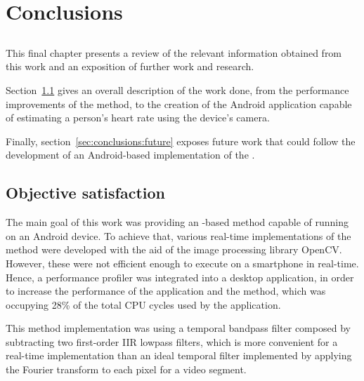 \chapter{Conclusions} \label{chap:conclusions}

\section*{}



This final chapter presents a review of the relevant information obtained
from this work and an exposition of further work and research.

Section~\ref{sec:conclusions:objectives} gives an overall description of
the work done, from the performance improvements of the \evm{} method,
to the creation of the Android application capable of estimating a
person's heart rate using the device's camera.

Finally, section~\ref{sec:conclusions:future} exposes future work that
could follow the development of an Android-based implementation
of the \evm{}.

\section{Objective satisfaction} \label{sec:conclusions:objectives}

The main goal of this work was providing an \evm{}-based method capable of
running on an Android device. To achieve that, various real-time
implementations of the \evm{} method were developed with the aid of the
image processing library OpenCV. However, these were
not efficient enough to execute on a smartphone in real-time. Hence,
a performance profiler was integrated into a desktop application, in order to
increase the performance of the application and the \evm{} method,
which was occupying 28\% of the total CPU cycles used by the application.

This \evm{} method implementation was using a temporal bandpass filter composed
by subtracting two first-order IIR lowpass filters, which is more convenient
for a real-time implementation than an ideal temporal filter implemented by
applying the Fourier transform to each pixel for a video segment.

